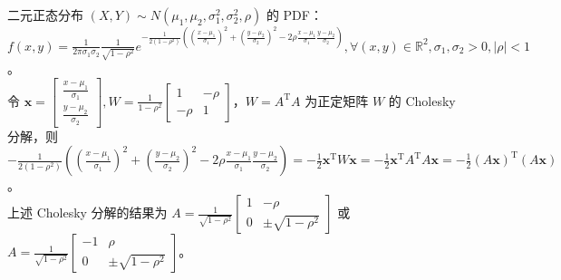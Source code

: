 \documentclass[../main.tex]{subfiles}
\begin{document}
\begin{example}\label{BVN}
    二元正态分布 $(X,Y)\sim N(\mu_1,\mu_2,\sigma_1^2,\sigma_2^2,\rho)$ 的 PDF：\\
    $f(x,y)=\frac{1}{2\pi\sigma_1\sigma_2}\frac{1}{\sqrt{1-\rho^2}}e^{-\frac{1}{2(1-\rho^2)}((\frac{x-\mu_1}{\sigma_1})^2+(\frac{y-\mu_2}{\sigma_2})^2-2\rho\frac{x-\mu_1}{\sigma_1}\frac{y-\mu_2}{\sigma_2})},\forall (x,y)\in\mathbb R^2,\sigma_1,\sigma_2>0,|\rho|<1$。\\
    令 $\boldsymbol{x}=\left[\begin{matrix}
                \frac{x-\mu_1}{\sigma_1} \\
                \frac{y-\mu_2}{\sigma_2}
            \end{matrix}\right],W=\frac1{1-\rho^2}\left[\begin{matrix}
                1     & -\rho \\
                -\rho & 1
            \end{matrix}\right]$，$W=A^\mathrm TA$ 为正定矩阵 $W$ 的 Cholesky 分解，则 $-\frac{1}{2(1-\rho^2)}((\frac{x-\mu_1}{\sigma_1})^2+(\frac{y-\mu_2}{\sigma_2})^2-2\rho\frac{x-\mu_1}{\sigma_1}\frac{y-\mu_2}{\sigma_2})=-\frac12\boldsymbol{x}^\mathrm TW\boldsymbol{x}=-\frac12\boldsymbol{x}^\mathrm TA^\mathrm TA\boldsymbol{x}=-\frac12 (A\boldsymbol x)^\mathrm T(A\boldsymbol x)$。\\
    上述 Cholesky 分解的结果为 $A=\frac{1}{\sqrt{1-\rho^2}}\left[\begin{matrix}
                1 & -\rho               \\
                0 & \pm \sqrt{1-\rho^2}
            \end{matrix}\right]
    $ 或 $A=\frac{1}{\sqrt{1-\rho^2}}\left[\begin{matrix}
                -1 & \rho                \\
                0  & \pm \sqrt{1-\rho^2}
            \end{matrix}\right]
    $。
\end{example}
\end{document}

